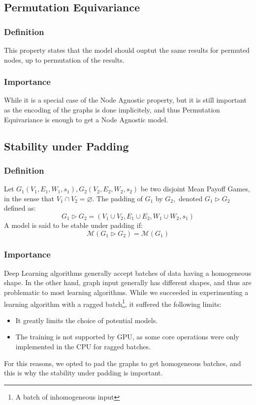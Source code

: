 \subsection{Permutation Equivariance}
\subsubsection{Definition}
This property states that the model should ouptut the same results for permuted nodes, up to permutation of the results.
\subsubsection{Importance}
While it is a special case of the Node Agnostic property, but it is still important as the encoding of the graphs is done implicitely, and thus Permutation Equivariance is enough to get a Node Agnostic model.
\subsection{Stability under Padding}
\subsubsection{Definition}
Let $G_1(V_1,E_1,W_1,s_1),G_2(V_2,E_2,W_2,s_2)$ be two disjoint Mean Payoff Games, in the sense that $V_1\cap V_2=\varnothing.$
\newline The padding of $G_1$ by $G_2,$ denoted $G_1\rhd G_2$ defined as:
$$
G_1\rhd G_2=(V_1\cup V_2,E_1\cup E_2,W_1\cup W_2,s_1)
$$
A model is said to be stable under padding if:
$$
\mathcal{M}(G_1\rhd G_2)=\mathcal{M}(G_1)
$$
\subsubsection{Importance}
Deep Learning algorithms generally accept batches of data having a homogeneous shape.
\newline In the other hand, graph input generally has different shapes, and thus are problematic to most learning algorithms.
\newline While we succeeded in experimenting a learning algorithm with a ragged batch\footnote{A batch of inhomogeneous input}, it suffered the following limits:
\begin{itemize}
	\item It greatly limits the choice of potential models. 
	\item The training is not supported by GPU, as some core operations were only implemented in the CPU for ragged batches.
\end{itemize}
For this reasons, we opted to pad the graphs to get homogeneous batches, and this is why the stability under padding is important.
